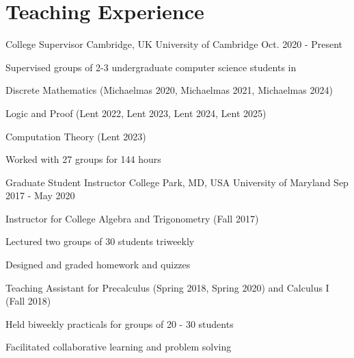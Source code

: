 \documentclass{academic-cv}
\begin{document}
\section*{Teaching Experience}
    \begin{cvlist}
        \cvheading
            {College Supervisor}
            {Cambridge, UK}
            {University of Cambridge}
            {Oct. 2020 - Present}
            {\begin{cvlist}
                \item Supervised groups of 2-3 undergraduate computer science students in
                    \begin{cvlist}
                        \item Discrete Mathematics (Michaelmas 2020, Michaelmas 2021, Michaelmas 2024)
                        \item Logic and Proof (Lent 2022, Lent 2023, Lent 2024, Lent 2025)
                        \item Computation Theory (Lent 2023)
                    \end{cvlist}
                    \vspace{0.3em}
                \item Worked with 27 groups for 144 hours
            \end{cvlist}}
        \cvheading
            {Graduate Student Instructor}
            {College Park, MD, USA}
            {University of Maryland}
            {Sep 2017 - May 2020}
            {\begin{cvlist}
                \item Instructor for College Algebra and Trigonometry (Fall 2017)
                    \begin{cvlist}
                        \item Lectured two groups of 30 students triweekly
                        \item Designed and graded homework and quizzes
                    \end{cvlist}
                    \vspace{0.2em}
                \item Teaching Assistant for Precalculus (Spring 2018, Spring 2020) and Calculus I (Fall 2018)
                    \begin{cvlist}
                        \item Held biweekly practicals for groups of 20 - 30 students
                        \item Facilitated collaborative learning and problem solving

\end{cvlist}
\end{cvlist}}
\end{cvlist}
\end{document}
